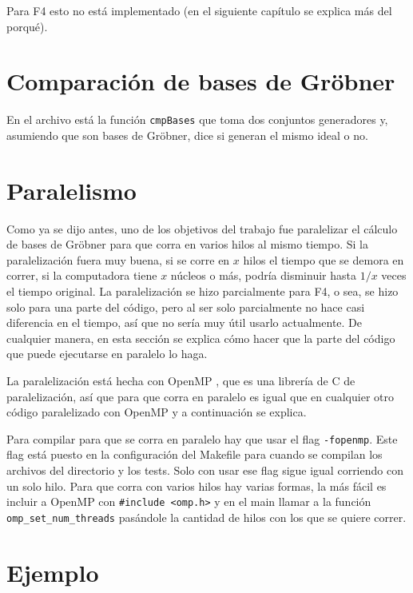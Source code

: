 \documentclass[12pt]{report}
\theoremstyle{customstyle}
\theoremstyle{factstyle}
\newcommand\cpp{C\nolinebreak[4]\hspace{-.05em}\raisebox{.4ex}{\relsize{-3}{\textbf{++}}}\xspace}
\begin{document}
Para F4 esto no está implementado (en el siguiente capítulo se explica más del porqué).


\section{Comparación de bases de Gröbner}\label{section:Comparación de bases de Gröbner (libreria)}

En el archivo  está la función \texttt{cmpBases} que toma dos conjuntos generadores y, asumiendo que son bases de Gröbner, dice si generan el mismo ideal o no.

\section{Paralelismo} %

Como ya se dijo antes, uno de los objetivos del trabajo fue paralelizar el cálculo de bases de Gröbner para que corra en varios hilos al mismo tiempo. Si la paralelización fuera muy buena, si se corre en $x$ hilos el tiempo que se demora en correr, si la computadora tiene $x$ núcleos o más, podría disminuir hasta $1/x$ veces el tiempo original. La paralelización se hizo parcialmente para F4, o sea, se hizo solo para una parte del código, pero al ser solo parcialmente no hace casi diferencia en el tiempo, así que no sería muy útil usarlo actualmente. De cualquier manera, en esta sección se explica cómo hacer que la parte del código que puede ejecutarse en paralelo lo haga.

La paralelización está hecha con OpenMP \cite{lib:openmp}, que es una librería de \cpp de paralelización, así que para que corra en paralelo es igual que en cualquier otro código paralelizado con OpenMP y a continuación se explica.

Para compilar para que se corra en paralelo hay que usar el flag \texttt{-fopenmp}. Este flag está puesto en la configuración del Makefile para cuando se compilan los archivos del directorio  y los tests. Solo con usar ese flag sigue igual corriendo con un solo hilo. Para que corra con varios hilos hay varias formas, la más fácil es incluir a OpenMP con \texttt{\#include <omp.h>} y en el main llamar a la función \texttt{omp\_set\_num\_threads} pasándole la cantidad de hilos con los que se quiere correr.


\section{Ejemplo}
\end{document}
